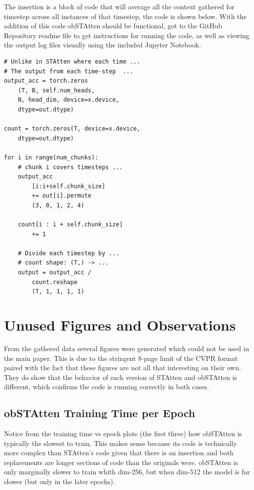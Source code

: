 \documentclass[../main.tex]{subfiles}
\begin{document}
\noindent The insertion is a block of code that will average all the context gathered for timestep across all instances of that timestep, the code is shown below. With the addition of this code obSTAtten should be functional, got to the GitHub Repository readme file to get instructions for running the code, as well as viewing the output log files visually using the included Jupyter Notebook.
\begin{verbatim}
# Unlike in STAtten where each time ...
# The output from each time-step  ...
output_acc = torch.zeros
	(T, B, self.num_heads, 
	N, head_dim, device=x.device, 
	dtype=out.dtype)
	
count = torch.zeros(T, device=x.device, 
	dtype=out.dtype)

for i in range(num_chunks):
	# chunk i covers timesteps ...
	output_acc
		[i:i+self.chunk_size] 
		+= out[i].permute
		(3, 0, 1, 2, 4)
		
	count[i : i + self.chunk_size] 
		+= 1

	# Divide each timestep by ...
	# count shape: (T,) -> ...
	output = output_acc / 
		count.reshape
		(T, 1, 1, 1, 1)
\end{verbatim}


\section{Unused Figures and Observations}
From the gathered data several figures were generated which could not be used in the main paper. This is due to the stringent 8-page limit of the CVPR format paired with the fact that these figures are not all that interesting on their own. They do show that the behavior of each version of STAtten and obSTAtten is different, which confirms the code is running correctly in both cases.

\subsection{obSTAtten Training Time per Epoch}
\par Notice from the training time vs epoch plots (the first three) how obSTAtten is typically the slowest to train. This makes sense because its code is technically more complex than STAtten's code given that there is an insertion and both replacements are longer sections of code than the originals were. obSTAtten is only marginally slower to train whith dim-256, but when dim-512 the model is far slower (but only in the later epochs).


\end{document}
